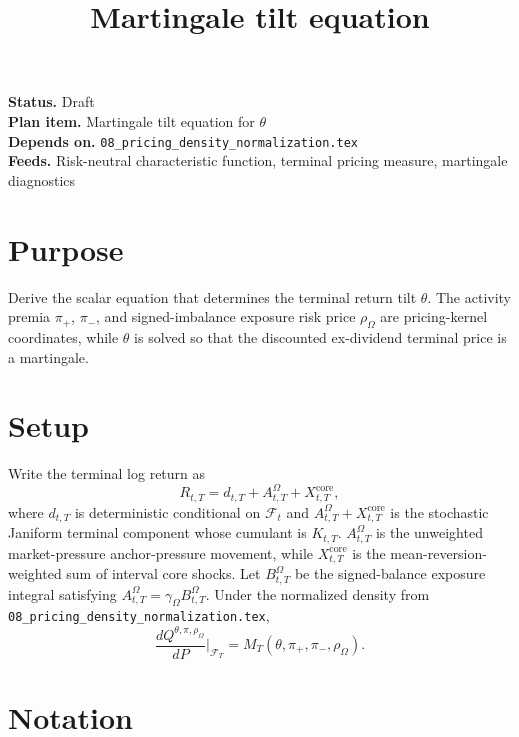 \documentclass[11pt]{article}
\title{Martingale tilt equation}
\author{}
\date{}
\begin{document}
\maketitle

\noindent\textbf{Status.} Draft\\
\textbf{Plan item.} Martingale tilt equation for \(\theta\)\\
\textbf{Depends on.} \texttt{08\_pricing\_density\_normalization.tex}\\
\textbf{Feeds.} Risk-neutral characteristic function, terminal pricing measure, martingale diagnostics

\section{Purpose}

Derive the scalar equation that determines the terminal return tilt
\(\theta\).
The activity premia \(\pi_+\), \(\pi_-\), and signed-imbalance exposure risk
price \(\rho_\Omega\) are pricing-kernel coordinates, while \(\theta\) is
solved so that the discounted ex-dividend terminal price is a martingale.

\section{Setup}

Write the terminal log return as
\[
    R_{t,T}
    =
    d_{t,T}
    +A_{t,T}^{\Omega}
    +X_{t,T}^{\mathrm{core}},
\]
where \(d_{t,T}\) is deterministic conditional on \(\mathcal F_t\) and
\(A_{t,T}^{\Omega}+X_{t,T}^{\mathrm{core}}\) is the stochastic Janiform
terminal component whose cumulant is \(K_{t,T}\).
\(A_{t,T}^{\Omega}\) is the unweighted market-pressure anchor-pressure
movement, while \(X_{t,T}^{\mathrm{core}}\) is the mean-reversion-weighted sum
of interval core shocks.
Let \(B_{t,T}^{\Omega}\) be the signed-balance exposure integral satisfying
\(A_{t,T}^{\Omega}=\gamma_\Omega B_{t,T}^{\Omega}\).
Under the normalized density from
\texttt{08\_pricing\_density\_normalization.tex},
\[
    \frac{dQ^{\theta,\pi,\rho_\Omega}}{dP}\bigg|_{\mathcal F_T}
    =
    M_T(\theta,\pi_+,\pi_-,\rho_\Omega).
\]

\section{Notation}
\end{document}
